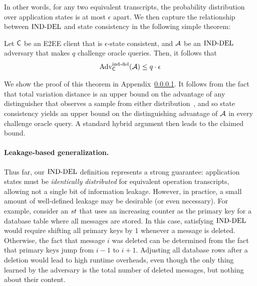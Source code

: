 In other words, for any two equivalent transcripts, the probability distribution over application states is at most $\epsilon$ apart. We then capture the relationship between $\textnormal{IND-DEL}$ and state consistency in the following simple theorem:
\begin{theorem}\label{thm:ind-del-state-consistency}
    Let $\mathsf{C}$ be an E2EE client that is $\epsilon$-state consistent, and $\mathcal{A}$ be an $\textnormal{IND-DEL}$ adversary that makes $q$ challenge oracle queries. Then, it follows that
    \[\textnormal{Adv}^{\textup{ind-del}}_{\mathsf{C}}(\mathcal{A}) \leq q \cdot \epsilon\]
\end{theorem}
We show the proof of this theorem in Appendix~\ref{}. 
It follows from the fact that total variation distance is an upper bound on the advantage of any distinguisher that observes a sample from either distribution~\cite{maurer2007indistinguishability}, and so state consistency yields an upper bound on the distinguishing advantage of $\mathcal{A}$ in every challenge oracle query. 
A standard hybrid argument then leads to the claimed bound.


\paragraph{Leakage-based generalization.} Thus far, our $\textnormal{IND-DEL}$ definition represents a strong guarantee: application states must be \emph{identically distributed} for equivalent operation transcripts, allowing not a single bit of information leakage. However, in practice, a small amount of well-defined leakage may be desirable (or even necessary). For example, consider an $st$ that uses an increasing counter as the primary key for a database table where all messages are stored. In this case, satisfying $\textnormal{IND-DEL}$ would require shifting all primary keys by 1 whenever a message is deleted. Otherwise, the fact that message $i$ was deleted can be determined from the fact that primary keys jump from $i-1$ to $i+1$. Adjusting all database rows after a deletion would lead to high runtime overheads, even though the only thing learned by the adversary is the total number of deleted messages, but nothing about their content.

